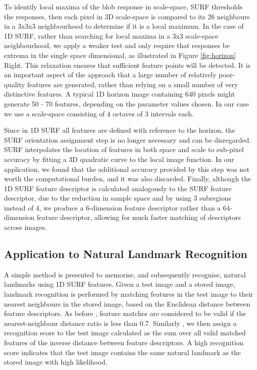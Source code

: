 \documentclass[runningheads,a4paper]{llncs}
\begin{document}
To identify local maxima of the blob response in scale-space, SURF thresholds the responses, then each pixel in 3D scale-space is compared to its 26 neighbours in a 3x3x3 neighbourhood to determine if it is a local maximum. In the case of 1D SURF, rather than searching for local maxima in a 3x3 scale-space neighbourhood, we apply a weaker test and only require that responses be extrema in the single space dimensional, as illustrated in Figure \ref{fig:horizon} Right. This relaxation ensures that sufficient feature points will be detected. It is an important aspect of the approach that a large number of relatively poor-quality features are generated, rather than relying on a small number of very distinctive features. A typical 1D horizon image containing 640 pixels might generate 50 - 70 features, depending on the parameter values chosen.  In our case we use a scale-space consisting of 4 octaves of 3 intervals each.

Since in 1D SURF all features are defined with reference to the horizon, the SURF orientation assignment step is no longer necessary and can be disregarded. SURF interpolates the location of features in both space and scale to sub-pixel accuracy by fitting a 3D quadratic curve to the local image function. In our application, we found that the additional accuracy provided by this step was not worth the computational burden, and it was also discarded. Finally, although the 1D SURF feature descriptor is calculated analogously to the SURF feature descriptor, due to the reduction in sample space and by using 3 subregions instead of 4, we produce a 6-dimension feature descriptor rather than a 64-dimension feature descriptor, allowing for much faster matching of descriptors across images. 


\subsection{Application to Natural Landmark Recognition}
A simple method is presented to memorise, and subsequently recognise, natural landmarks using 1D SURF features. Given a test image and a stored image, landmark recognition is performed by matching features in the test image to their nearest neighbours in the stored image, based on the Euclidean distance between feature descriptors. As before \cite{lowe2004SIFT}, feature matches are considered to be valid if the nearest-neighbour distance ratio is less than 0.7. Similarly \cite{briggs2006matching}, we then assign a recognition score to the test image calculated as the sum over all valid matched features of the inverse distance between feature descriptors. A high recognition score indicates that the test image contains the same natural landmark as the stored image with high likelihood. 
\end{document}
